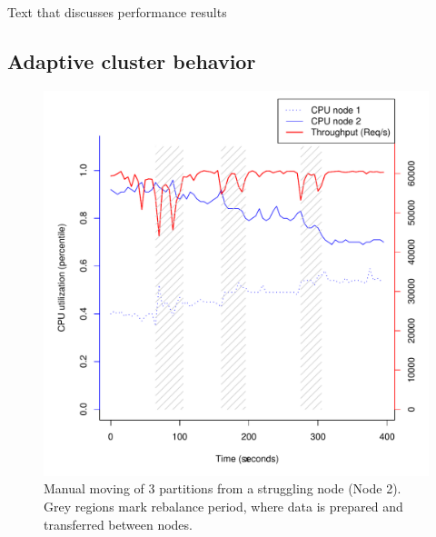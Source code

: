 Text that discusses performance results

\clearpage
\subsection{Adaptive cluster behavior}

\clearpage
\begin{figure}[h]
    \centering
    \includegraphics[width=1.2\textwidth]{results/rebalance_originalsrc}
    \caption{Manual moving of 3 partitions from a struggling node (Node 2). Grey regions mark rebalance period, where data is prepared and transferred between nodes.}
    \label{fig:adaptive}
\end{figure}

